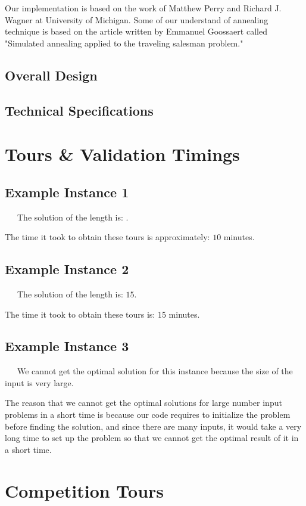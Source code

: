 \documentclass[11pt]{scrreprt}
\begin{document}
Our implementation is based on the work of Matthew Perry and Richard J. Wagner at University of Michigan. Some of our understand of annealing technique is based on the article written by Emmanuel Goossaert called "Simulated annealing applied to the traveling salesman problem."		 

\section{Overall Design}

\section{Technical Specifications}

\chapter{Tours \& Validation Timings}
\section{Example Instance 1}

\ \ \ The solution of the length is: $ $.

The time it took to obtain these tours is approximately: $10$ minutes.


\section{Example Instance 2}

\ \ \ The solution of the length is: $15$.

The time it took to obtain these tours is: $15$ minutes.


\section{Example Instance 3}

\ \ \ We cannot get the optimal solution for this instance because the size of the input is very large.

The reason that we cannot get the optimal solutions for large number input problems in a short time is because our code requires to initialize the problem before finding the solution, and since there are many inputs, it would take a very long time to set up the problem so that we cannot get the optimal result of it in a short time.

\chapter{Competition Tours}
\end{document}
